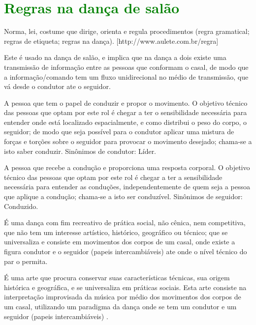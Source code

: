 
\chapter{\textcolor{green}{Regras na dança de salão}}

\begin{definition}[Regra:]
Norma, lei, costume que dirige, orienta e regula procedimentos (regra gramatical; regras de etiqueta; regras na dança).
[http://www.aulete.com.br/regra]
\end{definition}
\begin{definition} Este é usado na dança de salão, 
e implica que na dança a dois existe uma transmissão de informação
entre as pessoas que conformam o casal, 
de modo que a informação/comando tem um fluxo unidirecional no médio de transmissão,
que vá desde o condutor ate o seguidor. 
\end{definition}
\begin{definition} 
A pessoa que tem o papel de conduzir e propor o movimento. 
O objetivo técnico das pessoas que optam por este rol é chegar 
a ter o sensibilidade necessária para entender onde está localizado espacialmente, 
e como distribui o peso do corpo, o seguidor; 
de modo que seja possível para o condutor aplicar uma mistura de forças e torções sobre o seguidor para provocar o movimento desejado;
chama-se a isto saber conduzir.
Sinônimos de condutor: Líder.
\end{definition}
\begin{definition} 
A pessoa que recebe a condução e proporciona uma resposta corporal. 
O objetivo técnico das pessoas que optam por este rol é chegar 
a ter a sensibilidade necessária para entender as conduções,
independentemente de quem seja a pessoa que aplique a condução;
chama-se a isto ser conduzível.
Sinônimos de seguidor: Conduzido.
\end{definition}
\begin{definition}
É uma dança com fim recreativo de prática social, não cênica, nem competitiva, 
que não tem um interesse artístico, histórico, geográfico ou técnico; 
que se universaliza e consiste em movimentos dos corpos de um casal, 
onde existe a figura condutor e o seguidor (papeis intercambiáveis) \cite{Zamoner2012} ate onde o nível técnico do par o permita.
\end{definition}
\begin{definition}
É uma arte que procura conservar suas características técnicas, 
sua origem histórica e geográfica, e se universaliza em práticas sociais. 
Esta arte consiste na interpretação improvisada da música por médio dos movimentos 
dos corpos de um casal, utilizando um paradigma da dança onde se tem um condutor e um seguidor (papeis intercambiáveis) \cite{Zamoner2012}.
\end{definition}

